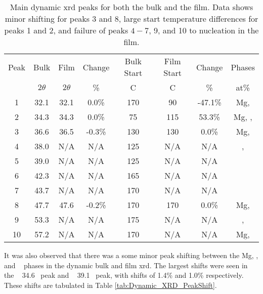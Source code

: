 \documentclass[draft,a4paper,12pt,oneside]{article}%
\begin{document}
\begin{table}[h]
	\centering
	\caption{Main dynamic \acrshort{xrd} peaks for both the bulk and the film. Data shows minor shifting for peaks 3 and 8, large start temperature differences for peaks 1 and 2, and failure of peaks $4-7$, 9, and 10 to nucleation in the film.}
	\begin{tabular}{ c c c c c c c c }
		\toprule
		Peak & Bulk & Film & Change & Bulk Start & Film Start & Change & Phases \\
		& $2\theta$ & $2\theta$ & \% & \degree C & \degree C & \% & at\% \\
		\midrule
		1    & 32.1 & 32.1 & 0.0\%  & 170 & 90 & -47.1\% & Mg, \MgZn \\
		2    & 34.3 & 34.3 & 0.0\%  & 75  & 115 & 53.3\% & Mg, \MgZn, \CaMgZnFive \\
		3    & 36.6 & 36.5 & -0.3\% & 130 & 130 & 0.0\%  & Mg, \MgZn \\
		4    & 38.0 & N/A  & N/A    & 125 & N/A & N/A    & \MgZn, \CaMgZnFive \\
		5    & 39.0 & N/A  & N/A    & 125 & N/A & N/A    & \MgZn \\
		6    & 42.3 & N/A  & N/A    & 165 & N/A & N/A    & \CaMgZnFive \\
		7    & 43.7 & N/A  & N/A    & 170 & N/A & N/A    & \CaMgZnFive \\
		8    & 47.7 & 47.6 & -0.2\% & 170 & 170 & 0.0\%  & Mg, \MgZn \\
		9    & 53.3 & N/A  & N/A    & 175 & N/A & N/A    & \MgZn, \CaMgZnFive \\
		10   & 57.2 & N/A  & N/A    & 170 & N/A  & N/A   & Mg, \MgZn \\
		\bottomrule
	\end{tabular}
	\label{tab:Dynamic_XRD}
\end{table}

It was also observed that there was a some minor peak shifting between the Mg, \MgZn, and \CaMgZnFive~ phases in the dynamic bulk and film \acrshort{xrd}. The largest shifts were seen in the \CaMgZnFive~ 34.6\degree~ peak and \MgZn~ 39.1\degree~ peak, with shifts of 1.4\% and 1.0\% respectively. These shifts are tabulated in Table \ref{tab:Dynamic_XRD_PeakShift}.
\end{document}
